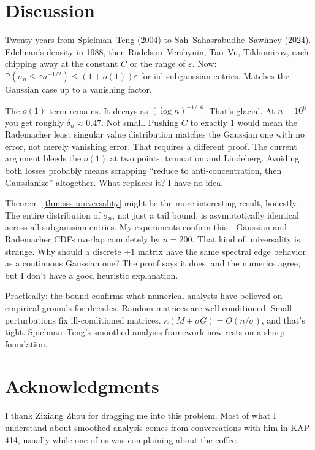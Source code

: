 \documentclass[11pt]{article}
\theoremstyle{definition}
\theoremstyle{remark}
\newcommand{\Prob}{\mathbb{P}}
\begin{document}
\section{Discussion}
\label{sec:discussion}

Twenty years from Spielman--Teng (2004) to Sah--Sahasrabudhe--Sawhney (2024).
Edelman's density in 1988, then Rudelson--Vershynin, Tao--Vu, Tikhomirov, each chipping away at the constant $C$ or the range of $\varepsilon$.
Now: $\Prob(\sigma_n \le \varepsilon n^{-1/2}) \le (1 + o(1))\varepsilon$ for iid subgaussian entries. Matches the Gaussian case up to a vanishing factor.

The $o(1)$ term remains. It decays as $(\log n)^{-1/16}$.
That's glacial. At $n = 10^6$ you get roughly $\delta_n \approx 0.47$. Not small.
Pushing $C$ to exactly $1$ would mean the Rademacher least singular value distribution matches the Gaussian one with no error, not merely vanishing error. That requires a different proof. The current argument bleeds the $o(1)$ at two points: truncation and Lindeberg.
Avoiding both losses probably means scrapping ``reduce to anti-concentration, then Gaussianize'' altogether.
What replaces it? I have no idea.

Theorem~\ref{thm:sss-universality} might be the more interesting result, honestly.
The entire distribution of $\sigma_n$, not just a tail bound, is asymptotically identical across all subgaussian entries. My experiments confirm this---Gaussian and Rademacher CDFs overlap completely by $n = 200$.
That kind of universality is strange. Why should a discrete $\pm 1$ matrix have the same spectral edge behavior as a continuous Gaussian one? The proof says it does, and the numerics agree, but I don't have a good heuristic explanation.

Practically: the bound confirms what numerical analysts have believed on empirical grounds for decades. Random matrices are well-conditioned. Small perturbations fix ill-conditioned matrices. $\kappa(M + \sigma G) = O(n/\sigma)$, and that's tight. Spielman--Teng's smoothed analysis framework now rests on a sharp foundation.

\section*{Acknowledgments}
I thank Zixiang Zhou for dragging me into this problem. Most of what I understand about smoothed analysis comes from conversations with him in KAP 414, usually while one of us was complaining about the coffee.



\end{document}
